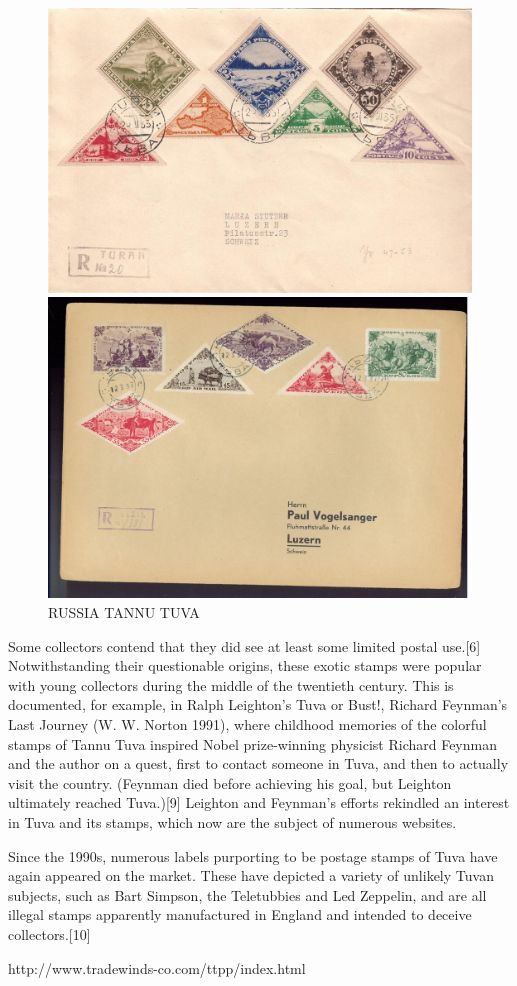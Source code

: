 \begin{figure}[htp]
\includegraphics[width=.80\textwidth]{../tannu-tuva/1935-cover.jpg}

\includegraphics[width=.80\textwidth]{../tannu-tuva/cover-01.jpg}
\caption{RUSSIA TANNU TUVA }
\end{figure}




Some collectors contend that they did see at least some limited postal use.[6]
Notwithstanding their questionable origins, these exotic stamps were popular with young collectors during the middle of the twentieth century. This is documented, for example, in Ralph Leighton's Tuva or Bust!, Richard Feynman's Last Journey (W. W. Norton 1991), where childhood memories of the colorful stamps of Tannu Tuva inspired Nobel prize-winning physicist Richard Feynman and the author on a quest, first to contact someone in Tuva, and then to actually visit the country. (Feynman died before achieving his goal, but Leighton ultimately reached Tuva.)[9] Leighton and Feynman's efforts rekindled an interest in Tuva and its stamps, which now are the subject of numerous websites.

Since the 1990s, numerous labels purporting to be postage stamps of Tuva have again appeared on the market. These have depicted a variety of unlikely Tuvan subjects, such as Bart Simpson, the Teletubbies and Led Zeppelin, and are all illegal stamps apparently manufactured in England and intended to deceive collectors.[10]





http://www.tradewinds-co.com/ttpp/index.html



                                                    